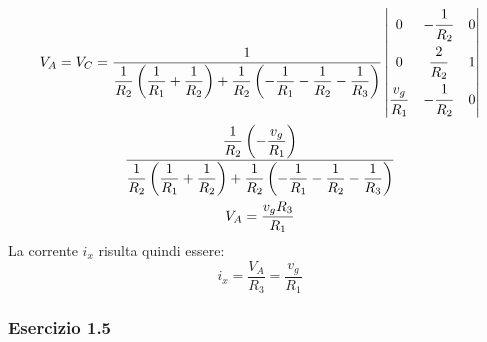 \documentclass{article}
\begin{document}
\begin{gather*}
    V_A=V_C=\displaystyle\frac{1}{\displaystyle\frac{1}{R_2}\left(\frac{1}{R_1}+\frac{1}{R_2}\right)+\frac{1}{R_2}\left(-\frac{1}{R_1}-\frac{1}{R_2}-\frac{1}{R_3}\right)}
    \begin{vmatrix}
        0&-\displaystyle\frac{\strut1}{\strut R_2}&0\\
        0&\displaystyle\frac{\strut2}{\strut R_2}&1\\
        \displaystyle\frac{\strut v_g}{\strut R_1}&-\displaystyle\frac{\strut1}{\strut R_2}&0
    \end{vmatrix}\\
    \displaystyle\frac{\displaystyle\frac{1}{R_2}\left(-\frac{v_g}{R_1}\right)}{\displaystyle\frac{1}{R_2}\left(\frac{1}{R_1}+\frac{1}{R_2}\right)+\frac{1}{R_2}\left(-\frac{1}{R_1}-\frac{1}{R_2}-\frac{1}{R_3}\right)}\\
    V_A=\displaystyle\frac{v_gR_3}{R_1}
\end{gather*}
La corrente $i_x$ risulta quindi essere:
\begin{equation}
    i_x=\displaystyle\frac{V_A}{R_3}=\frac{v_g}{R_1}
\end{equation}

\subsubsection*{Esercizio 1.5}
\end{document}
